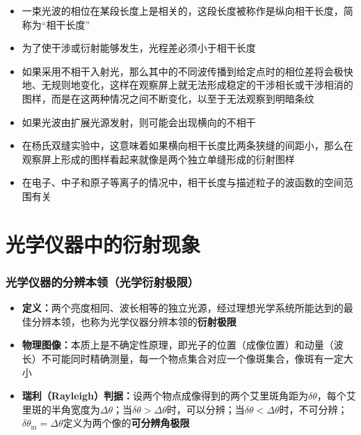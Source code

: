 \documentclass[10pt]{beamer}
\newenvironment{slide}{
    \begin{frame}{\bfseries{\sectiontitle}}
}{
    \end{frame}
}
\let\sectiononly\section
\renewcommand{\section}[1]{
    \sectiononly{#1}
    \let\sectiontitle\relax
    \newcommand{\sectiontitle}{#1}
}
\begin{document}
\begin{slide}
    \begin{itemize}
        \item 一束光波的相位在某段长度上是相关的，这段长度被称作是纵向相干长度，简称为“相干长度”
        \item 为了使干涉或衍射能够发生，光程差必须小于相干长度
        \item 如果采用不相干入射光，那么其中的不同波传播到给定点时的相位差将会极快地、无规则地变化，这样在观察屏上就无法形成稳定的干涉相长或干涉相消的图样，而是在这两种情况之间不断变化，以至于无法观察到明暗条纹
        \item 如果光波由扩展光源发射，则可能会出现横向的不相干
        \item 在杨氏双缝实验中，这意味着如果横向相干长度比两条狭缝的间距小，那么在观察屏上形成的图样看起来就像是两个独立单缝形成的衍射图样
        \item 在电子、中子和原子等离子的情况中，相干长度与描述粒子的波函数的空间范围有关
    \end{itemize}
\end{slide}

\part{光学仪器中的衍射现象}

\begin{frame}
    \partpage
    \tableofcontents
\end{frame}

\section{光学仪器的分辨本领（光学衍射极限）}

\begin{slide}
    \begin{itemize}
        \item \textbf{定义：}两个亮度相同、波长相等的独立光源，经过理想光学系统所能达到的最佳分辨本领，也称为光学仪器分辨本领的\textbf{衍射极限}
        \item \textbf{物理图像：}本质上是不确定性原理，即光子的位置（成像位置）和动量（波长）不可能同时精确测量，每一个物点集合对应一个像斑集合，像斑有一定大小
        \item \textbf{瑞利（Rayleigh）判据：}设两个物点成像得到的两个艾里斑角距为$\delta\theta$，每个艾里斑的半角宽度为$\Delta\theta$；当$\delta\theta>\Delta\theta$时，可以分辨；当$\delta\theta<\Delta\theta$时，不可分辨；$\delta\theta_{\mathrm{m}}=\Delta\theta$定义为两个像的\textbf{可分辨角极限}
    \end{itemize}
\end{slide}
\end{document}
